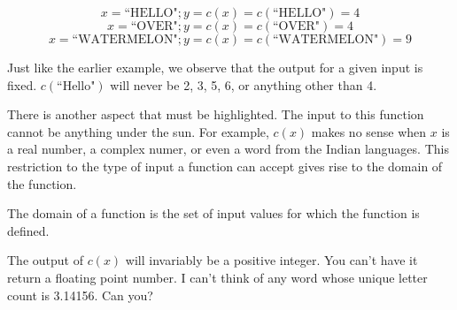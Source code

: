 \begin{equation}
x = \text{``HELLO"}; y = c(x) = c(\text{``HELLO"}) = 4
\end{equation}
\begin{equation}
x = \text{``OVER"}; y = c(x) = c(\text{``OVER"}) = 4
\end{equation}
\begin{equation}
x = \text{``WATERMELON"}; y = c(x) = c(\text{``WATERMELON"}) = 9
\end{equation}

Just like the earlier example, we observe that the output for a given input is fixed. $c(\text{``Hello"})$ will never be 2, 3, 5, 6, or anything other than 4.

There is another aspect that must be highlighted. The input to this function cannot be anything under the sun. For example, $c(x)$ makes no sense when $x$ is a real number, a complex numer, or even a word from the Indian languages. This restriction to the type of input a function can accept gives rise to the domain of the function.

\begin{definition}
The domain of a function is the set of input values for which the function is defined.
\end{definition}

The output of $c(x)$ will invariably be a positive integer. You can't have it return a floating point number. I can't think of any word whose unique letter count is 3.14156. Can you?
